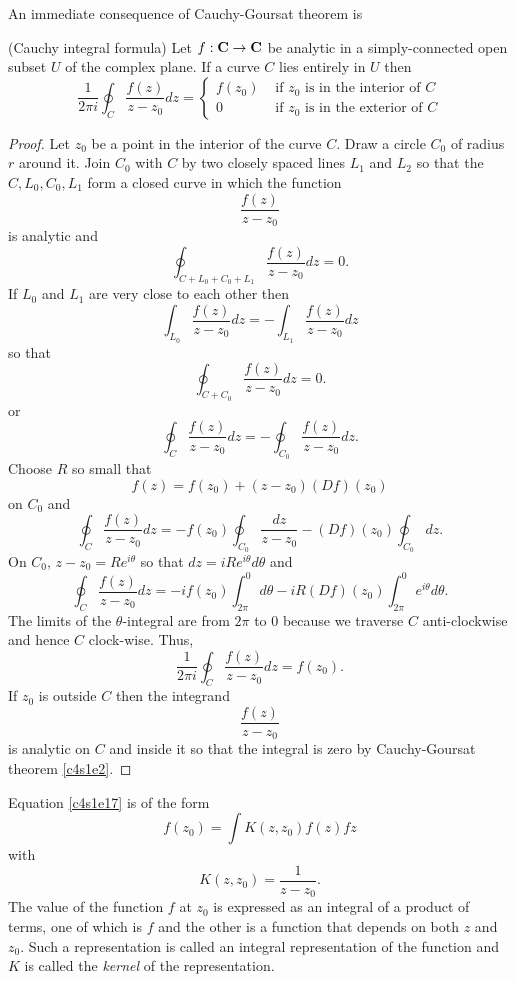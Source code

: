 An immediate consequence of Cauchy-Goursat theorem is
\begin{thm}(Cauchy integral formula)\label{c4s1t3}
Let $f:\mathbf{C} \rightarrow \mathbf{C}$ be analytic in a simply-connected open subset
$U$ of the complex plane. If a curve $C$ lies entirely in $U$ then
\begin{equation}\label{c4s1e17}
\frac{1}{2\pi i}\oint_C \frac{f(z)}{z - z_0}dz = \begin{cases}
f(z_0) & \text{ if $z_0$ is in the interior of $C$} \\
0      & \text{ if $z_0$ is in the exterior of $C$}
\end{cases}
\end{equation}
\end{thm}
\begin{proof}
Let $z_0$ be a point in the interior of the curve $C$. Draw a circle $C_0$ of 
radius $r$ around it. Join $C_0$ with $C$ by two closely spaced lines $L_1$ and
$L_2$ so that the $C, L_0, C_0, L_1$ form a closed curve in which the function
\[
\frac{f(z)}{z - z_0}
\]
is analytic and
\[
\oint_{C + L_0 + C_0 + L_1}\frac{f(z)}{z - z_0}dz = 0.
\]
If $L_0$ and $L_1$ are very close to each other then
\[
\int_{L_0} \frac{f(z)}{z - z_0}dz = 
-\int_{L_1} \frac{f(z)}{z - z_0}dz
\]
so that
\[
\oint_{C + C_0}\frac{f(z)}{z - z_0}dz = 0.
\]
or
\[
\oint_C \frac{f(z)}{z - z_0}dz = -\oint_{C_0}\frac{f(z)}{z - z_0}dz.
\]
Choose $R$ so small that
\[
f(z) = f(z_0) + (z - z_0)(Df)(z_0)
\]
on $C_0$ and
\[
\oint_C \frac{f(z)}{z - z_0}dz = -f(z_0)\oint_{C_0}\frac{dz}{z - z_0} -
 (Df)(z_0)\oint_{C_0}dz.
\]
On $C_0$, $z - z_0 = Re^{i\theta}$ so that $dz = iRe^{i\theta}d\theta$ and
\[
\oint_C \frac{f(z)}{z - z_0}dz = -if(z_0)\int_{2\pi}^0 d\theta - iR(Df)(z_0)
\int_{2\pi}^0 e^{i\theta}d\theta.
\]
The limits of the $\theta$-integral are from $2\pi$ to $0$ because we traverse
$C$ anti-clockwise and hence $C$ clock-wise. Thus,
\[
\frac{1}{2\pi i}\oint_C \frac{f(z)}{z - z_0}dz = f(z_0).
\]
If $z_0$ is outside $C$ then the integrand
\[
\frac{f(z)}{z - z_0}
\]
is analytic on $C$ and inside it so that the integral is zero by Cauchy-Goursat
theorem \ref{c4s1e2}.
\end{proof}

Equation \eqref{c4s1e17} is of the form
\begin{equation}\label{c4s1e18}
f(z_0) = \int K(z, z_0)f(z)fz
\end{equation}
with
\[
K(z, z_0) = \frac{1}{z - z_0}.
\]
The value of the function $f$ at $z_0$ is expressed as an integral of a product
of terms, one of which is $f$ and the other is a function that depends on both
$z$ and $z_0$. Such a representation is called an integral representation of 
the function and $K$ is called the \emph{kernel} of the representation.

